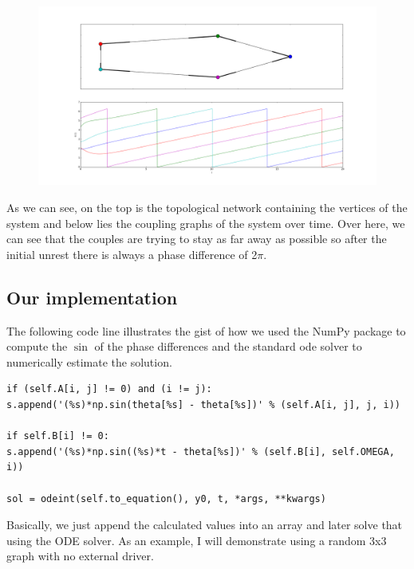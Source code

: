 \begin{figure}[h!]
\centering
\includegraphics[width=0.8\linewidth]{imgs/examplefigure}
\caption{}
\end{figure}

As we can see, on the top is the topological network containing the vertices of the system and below lies the coupling graphs of the system over time. Over here, we can see that the couples are trying to stay as far away as possible so after the initial unrest there is always a phase difference of 2$\pi$. 


\subsection{Our implementation}
The following code line illustrates the gist of how we used the NumPy package to compute the $\sin$ of the phase differences and the standard ode solver to numerically estimate the solution.
\begin{lstlisting}
if (self.A[i, j] != 0) and (i != j):
s.append('(%s)*np.sin(theta[%s] - theta[%s])' % (self.A[i, j], j, i))

if self.B[i] != 0:
s.append('(%s)*np.sin((%s)*t - theta[%s])' % (self.B[i], self.OMEGA, i))

sol = odeint(self.to_equation(), y0, t, *args, **kwargs)
\end{lstlisting}
Basically, we just append the calculated values into an array and later solve that using the ODE solver. As an example, I will demonstrate using a random 3x3 graph with no external driver.



